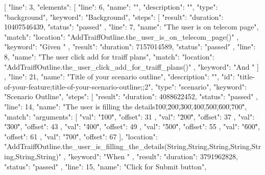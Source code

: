 [
  {
    "line": 3,
    "elements": [
      {
        "line": 6,
        "name": "",
        "description": "",
        "type": "background",
        "keyword": "Background",
        "steps": [
          {
            "result": {
              "duration": 10407546439,
              "status": "passed"
            },
            "line": 7,
            "name": "The user is on telecom page",
            "match": {
              "location": "AddTraiffOutline.the_user_is_on_telecom_page()"
            },
            "keyword": "Given "
          },
          {
            "result": {
              "duration": 7157014589,
              "status": "passed"
            },
            "line": 8,
            "name": "The user click add for traiff plans",
            "match": {
              "location": "AddTraiffOutline.the_user_click_add_for_traiff_plans()"
            },
            "keyword": "And "
          }
        ]
      },
      {
        "line": 21,
        "name": "Title of your scenario outline",
        "description": "",
        "id": "title-of-your-feature;title-of-your-scenario-outline;;2",
        "type": "scenario",
        "keyword": "Scenario Outline",
        "steps": [
          {
            "result": {
              "duration": 4088622452,
              "status": "passed"
            },
            "line": 14,
            "name": "The user is filling the details\"100\",\"200\",\"300\",\"400\",\"500\",\"600\",\"700\"",
            "match": {
              "arguments": [
                {
                  "val": "\"100\"",
                  "offset": 31
                },
                {
                  "val": "\"200\"",
                  "offset": 37
                },
                {
                  "val": "\"300\"",
                  "offset": 43
                },
                {
                  "val": "\"400\"",
                  "offset": 49
                },
                {
                  "val": "\"500\"",
                  "offset": 55
                },
                {
                  "val": "\"600\"",
                  "offset": 61
                },
                {
                  "val": "\"700\"",
                  "offset": 67
                }
              ],
              "location": "AddTraiffOutline.the_user_is_filling_the_details(String,String,String,String,String,String,String)"
            },
            "keyword": "When "
          },
          {
            "result": {
              "duration": 3791962828,
              "status": "passed"
            },
            "line": 15,
            "name": "Click for Submit button",
}}}
